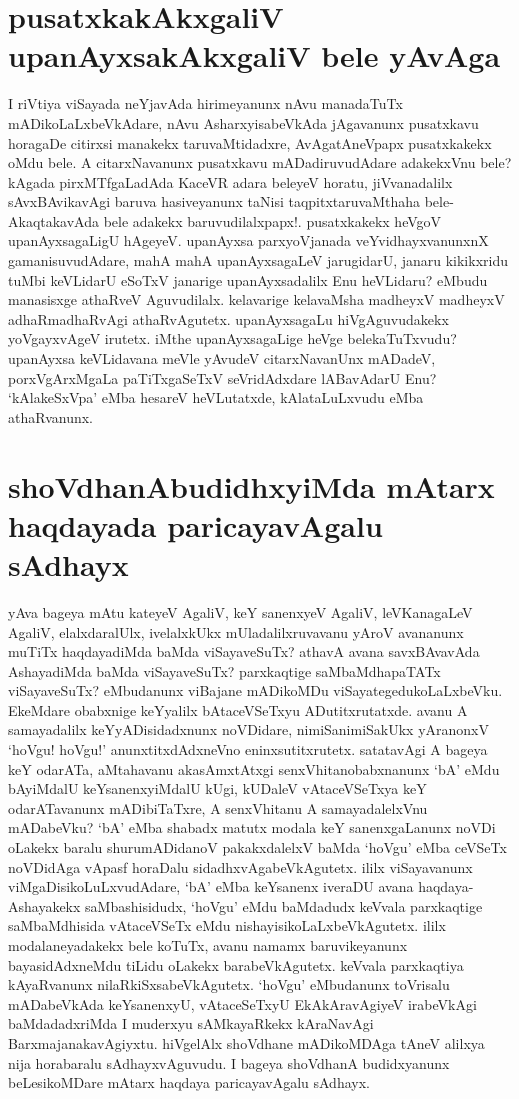 \section*{pusatxkakAkxgaliV upanAyxsakAkxgaliV bele yAvAga}

I riVtiya viSayada neYjavAda hirimeyanunx nAvu manadaTuTx mADikoLaLxbeVkAdare, nAvu AsharxyisabeVkAda jAgavanunx pusatxkavu horagaDe citirxsi manakekx taruvaMtidadxre, AvAgatAneVpapx pusatxkakekx oMdu bele. A citarxNavanunx pusatxkavu mADadiruvudAdare adakekxVnu bele? kAgada pirxMTfgaLadAda KaceVR adara beleyeV horatu, jiVvanadalilx sAvxBAvikavAgi baruva hasiveyanunx taNisi taqpitxtaruvaMthaha bele-AkaqtakavAda bele adakekx baruvudilalxpapx!. pusatxkakekx heVgoV upanAyxsagaLigU hAgeyeV. upanAyxsa parxyoVjanada veYvidhayxvanunxnX gamanisuvudAdare, mahA mahA upanAyxsagaLeV jarugidarU, janaru kikikxridu tuMbi keVLidarU eSoTxV janarige upanAyxsadalilx Enu heVLidaru? eMbudu manasisxge athaRveV Aguvudilalx. kelavarige kelavaMsha madheyxV madheyxV adhaRmadhaRvAgi athaRvAgutetx. upanAyxsagaLu hiVgAguvudakekx yoVgayxvAgeV irutetx. iMthe upanAyxsagaLige heVge belekaTuTxvudu? upanAyxsa keVLidavana meVle yAvudeV citarxNavanUnx mADadeV, porxVgArxMgaLa paTiTxgaSeTxV seVridAdxdare lABavAdarU Enu? `kAlakeSxVpa' eMba hesareV heVLutatxde, kAlataLuLxvudu eMba athaRvanunx.

\section*{shoVdhanAbudidhxyiMda mAtarx haqdayada paricayavAgalu sAdhayx}

yAva bageya mAtu kateyeV AgaliV, keY sanenxyeV AgaliV, leVKanagaLeV AgaliV, elalxdaralUlx, ivelalxkUkx mUladalilxruvavanu yAroV avananunx muTiTx haqdayadiMda baMda viSayaveSuTx? athavA avana savxBAvavAda AshayadiMda baMda viSayaveSuTx? parxkaqtige saMbaMdhapaTATx viSayaveSuTx? eMbudanunx viBajane mADikoMDu viSayategedukoLaLxbeVku. EkeMdare obabxnige keYyalilx bAtaceVSeTxyu ADutitxrutatxde. avanu A samayadalilx keYyADisidadxnunx  noVDidare, nimiSanimiSakUkx yAranonxV `hoVgu! hoVgu!' anunxtitxdAdxneVno eninxsutitxrutetx. satatavAgi A bageya keY odarATa, aMtahavanu akasAmxtAtxgi senxVhitanobabxnanunx `bA' eMdu bAyiMdalU keYsanenxyiMdalU kUgi, kUDaleV vAtaceVSeTxya keY odarATavanunx mADibiTaTxre, A senxVhitanu A samayadalelxVnu mADabeVku? `bA' eMba shabadx matutx modala keY sanenxgaLanunx noVDi oLakekx baralu shurumADidanoV pakakxdalelxV baMda `hoVgu' eMba ceVSeTx  noVDidAga vApasf horaDalu sidadhxvAgabeVkAgutetx. ililx viSayavanunx viMgaDisikoLuLxvudAdare, `bA' eMba keYsanenx iveraDU avana haqdaya-Ashayakekx saMbashisidudx, `hoVgu' eMdu baMdadudx keVvala parxkaqtige saMbaMdhisida vAtaceVSeTx eMdu nishayisikoLaLxbeVkAgutetx. ililx modalaneyadakekx bele koTuTx, avanu namamx baruvikeyanunx bayasidAdxneMdu tiLidu oLakekx  barabeVkAgutetx. keVvala parxkaqtiya kAyaRvanunx nilaRkiSxsabeVkAgutetx. `hoVgu' eMbudanunx toVrisalu mADabeVkAda keYsanenxyU, vAtaceSeTxyU EkAkAravAgiyeV irabeVkAgi baMdadadxriMda I muderxyu sAMkayaRkekx kAraNavAgi BarxmajanakavAgiyxtu. hiVgelAlx shoVdhane mADikoMDAga tAneV alilxya nija horabaralu sAdhayxvAguvudu. I bageya shoVdhanA budidxyanunx beLesikoMDare mAtarx haqdaya paricayavAgalu sAdhayx. 

